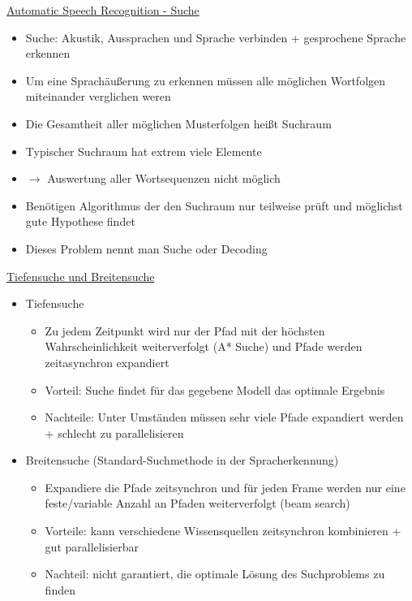 \documentclass[a4paper,10pt,oneside]{article}
\begin{document}
\underline{Automatic Speech Recognition - Suche} \\
	\begin{itemize}
		\item Suche: Akustik, Aussprachen und Sprache verbinden + gesprochene Sprache erkennen
		\item Um eine Sprachäußerung zu erkennen müssen alle möglichen Wortfolgen miteinander verglichen weren
		\item Die Gesamtheit aller möglichen Musterfolgen heißt Suchraum
		\item Typischer Suchraum hat extrem viele Elemente
		\item[] $\rightarrow$ Auswertung aller Wortsequenzen nicht möglich
		\item Benötigen Algorithmus der den Suchraum nur teilweise prüft und möglichst gute Hypothese findet 
		\item Dieses Problem nennt man Suche oder Decoding 
	\end{itemize}

\underline{Tiefensuche und Breitensuche} \\
	\begin{itemize}
		\item Tiefensuche
			\begin{itemize}
				\item Zu jedem Zeitpunkt wird nur der Pfad mit der höchsten Wahrscheinlichkeit weiterverfolgt (A* Suche) und Pfade werden zeitasynchron expandiert
				\item Vorteil: Suche findet für das gegebene Modell das optimale Ergebnis
				\item Nachteile: Unter Umständen müssen sehr viele Pfade expandiert werden + schlecht zu parallelisieren
			\end{itemize}
		\item Breitensuche (Standard-Suchmethode in der Spracherkennung)
			\begin{itemize}
				\item Expandiere die Pfade zeitsynchron und für jeden Frame werden nur eine feste/variable Anzahl an Pfaden weiterverfolgt (beam search)
				\item Vorteile: kann verschiedene Wissensquellen zeitsynchron kombinieren + gut parallelisierbar
				\item Nachteil: nicht garantiert, die optimale Lösung des Suchproblems zu finden
			\end{itemize}
	\end{itemize}
 
\end{document}
